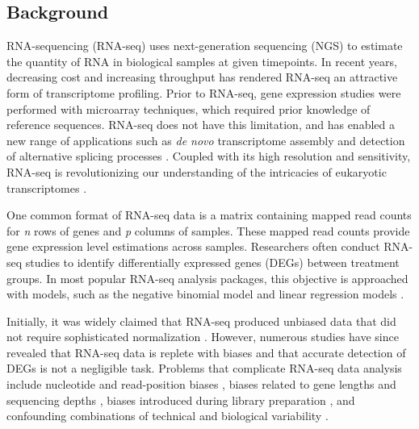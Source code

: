 \documentclass{bmcart}
\begin{document}
\begin{linenumbers} %
\begin{doublespacing} %


\section*{Background}

RNA-sequencing (RNA-seq) uses next-generation sequencing (NGS) to estimate the quantity of RNA in biological samples at given timepoints. In recent years, decreasing cost and increasing throughput has rendered RNA-seq an attractive form of transcriptome profiling. Prior to RNA-seq, gene expression studies were performed with microarray techniques, which required prior knowledge of reference sequences. RNA-seq does not have this limitation, and has enabled a new range of applications such as \textit{de novo} transcriptome assembly \cite{Robertson} and detection of alternative splicing processes \cite{Anders2012, Pan}. Coupled with its high resolution and sensitivity, RNA-seq is revolutionizing our understanding of the intricacies of eukaryotic transcriptomes \cite{Wang, Zhao}.

One common format of RNA-seq data is a matrix containing mapped read counts for \textit{n} rows of genes and \textit{p} columns of samples. These mapped read counts provide gene expression level estimations across samples. Researchers often conduct RNA-seq studies to identify differentially expressed genes (DEGs) between treatment groups. In most popular RNA-seq analysis packages, this objective is approached with models, such as the negative binomial model \cite{Anders2010, Trapnell2012, Trapnell2013, Robinson} and linear regression models \cite{Law}. 

Initially, it was widely claimed that RNA-seq produced unbiased data that did not require sophisticated normalization \cite{Wang, Morin, Marioni}. However, numerous studies have since revealed that RNA-seq data is replete with biases and that accurate detection of DEGs is not a negligible task. Problems that complicate RNA-seq data analysis include nucleotide and read-position biases \cite{Hansen}, biases related to gene lengths and sequencing depths \cite{Oshlack, RobinsonOshlack}, biases introduced during library preparation \cite{McIntyre}, and confounding combinations of technical and biological variability \cite{Bullard}.


\end{doublespacing}
\end{linenumbers}
\end{document}

